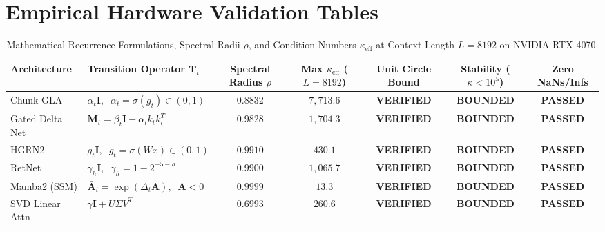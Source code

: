 \documentclass[journal]{IEEEtran}
\begin{document}
\section{Empirical Hardware Validation Tables}

\begin{table}[t]
\centering
\caption{Mathematical Recurrence Formulations, Spectral Radii $\rho$, and Condition Numbers $\kappa_{\text{eff}}$ at Context Length $L=8192$ on NVIDIA RTX 4070.}
\label{tab:recurrence_audit}
\begin{tabular}{llccccc}
\toprule
\textbf{Architecture} & \textbf{Transition Operator} $\mathbf{T}_t$ & \textbf{Spectral Radius} $\rho$ & \textbf{Max} $\kappa_{\text{eff}}$ ($L=8192$) & \textbf{Unit Circle Bound} & \textbf{Stability ($\kappa < 10^5$)} & \textbf{Zero NaNs/Infs} \\
\midrule
Chunk GLA & $\alpha_t \mathbf{I}, \;\; \alpha_t = \sigma(g_t) \in (0, 1)$ & $0.8832$ & $7,713.6$ & \textbf{VERIFIED} & \textbf{BOUNDED} & \textbf{PASSED} \\
Gated Delta Net & $\mathbf{M}_t = \beta_t \mathbf{I} - \alpha_t k_t k_t^T$ & $0.9828$ & $1,704.3$ & \textbf{VERIFIED} & \textbf{BOUNDED} & \textbf{PASSED} \\
HGRN2 & $g_t \mathbf{I}, \;\; g_t = \sigma(W x) \in (0, 1)$ & $0.9910$ & $430.1$ & \textbf{VERIFIED} & \textbf{BOUNDED} & \textbf{PASSED} \\
RetNet & $\gamma_h \mathbf{I}, \;\; \gamma_h = 1 - 2^{-5-h}$ & $0.9900$ & $1,065.7$ & \textbf{VERIFIED} & \textbf{BOUNDED} & \textbf{PASSED} \\
Mamba2 (SSM) & $\bar{\mathbf{A}}_t = \exp(\Delta_t \mathbf{A}), \;\; \mathbf{A} < 0$ & $0.9999$ & $13.3$ & \textbf{VERIFIED} & \textbf{BOUNDED} & \textbf{PASSED} \\
SVD Linear Attn & $\gamma \mathbf{I} + U \Sigma V^T$ & $0.6993$ & $260.6$ & \textbf{VERIFIED} & \textbf{BOUNDED} & \textbf{PASSED} \\
\bottomrule
\end{tabular}
\end{table}
\end{document}
